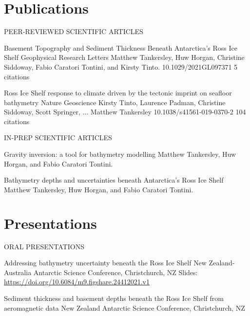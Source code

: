 \documentclass{ExpressiveResume}
\begin{document}
\section{Publications}
\noindent PEER-REVIEWED SCIENTIFIC ARTICLES \newline
\begin{cventries}
    {Basement Topography and Sediment Thickness Beneath Antarctica’s Ross Ice Shelf}
    {Geophysical Research Letters}
    {Matthew Tankersley, Huw Horgan, Christine Siddoway, Fabio Caratori Tontini, and Kirsty Tinto.}
    {10.1029/2021GL097371}
    {5 citations}

    {Ross Ice Shelf response to climate driven by the tectonic
        imprint on seafloor bathymetry}
    {Nature Geoscience}
    {Kirsty Tinto, Laurence Padman, Christine Siddoway, Scott Springer, ... Matthew Tankersley}
    {10.1038/s41561-019-0370-2}
    {104 citations}
\end{cventries}


\noindent IN-PREP SCIENTIFIC ARTICLES \newline
\begin{cventries}
    {Gravity inversion: a tool for bathymetry modelling}
    {Matthew Tankersley, Huw Horgan, and Fabio Caratori Tontini.}

    {Bathymetry depths and uncertainties beneath Antarctica's Ross Ice Shelf}
    {Matthew Tankersley, Huw Horgan, and Fabio Caratori Tontini.}

\end{cventries}


\section{Presentations}
\noindent ORAL PRESENTATIONS \newline
\begin{cventries}
    {Addressing bathymetry uncertainty beneath the Ross Ice Shelf}
    {New Zealand-Australia Antarctic Science Conference, Christchurch, NZ}
    {Slides: \url{https://doi.org/10.6084/m9.figshare.24412021.v1}}
    {}
    {}

    {Sediment thickness and basement depths beneath the Ross Ice Shelf from aeromagnetic data}
    {New Zealand Antarctic Science Conference, Christchurch, NZ}
    {}
    {}

\end{cventries}
\end{document}
